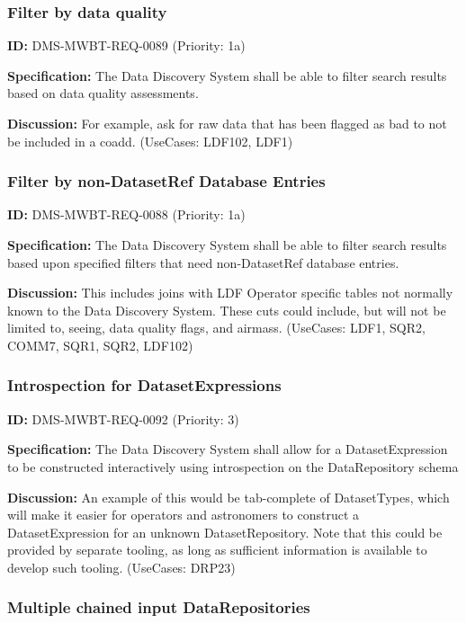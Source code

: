 \documentclass[SE,toc,lsstdraft]{lsstdoc}
\begin{document}
\subsubsection{Filter by data quality}

\label{DMS-MWBT-REQ-0089}
\textbf{ID:} DMS-MWBT-REQ-0089 (Priority: 1a)

\textbf{Specification:}
The Data Discovery System shall be able to filter search results based on data quality assessments.

\textbf{Discussion:}
For example, ask for raw data that has been flagged as bad to not be included in a coadd. (UseCases: LDF102, LDF1)

\subsubsection{Filter by non-DatasetRef Database Entries}

\label{DMS-MWBT-REQ-0088}
\textbf{ID:} DMS-MWBT-REQ-0088 (Priority: 1a)

\textbf{Specification:}
The Data Discovery System shall be able to filter search results based upon specified filters that need non-DatasetRef database entries.

\textbf{Discussion:}
This includes joins with LDF Operator specific tables not normally known to the Data Discovery System. These cuts could include, but will not be limited to, seeing, data quality flags, and airmass. (UseCases: LDF1, SQR2, COMM7, SQR1, SQR2, LDF102)

\subsubsection{Introspection for DatasetExpressions}

\label{DMS-MWBT-REQ-0092}
\textbf{ID:} DMS-MWBT-REQ-0092 (Priority: 3)

\textbf{Specification:}
The Data Discovery System shall allow for a DatasetExpression to be constructed interactively using introspection on the DataRepository schema

\textbf{Discussion:}
An example of this would be tab-complete of DatasetTypes, which will make it easier for operators and astronomers to construct a DatasetExpression for an unknown DatasetRepository. Note that this could be provided by separate tooling, as long as sufficient information is available to develop such tooling. (UseCases: DRP23)

\subsubsection{Multiple chained input DataRepositories}
\end{document}
